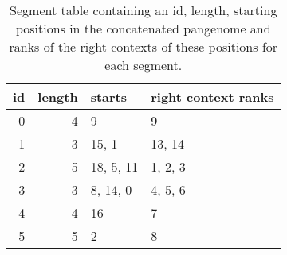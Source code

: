 \begin{table}
    \caption{
    Segment table containing an id, length, starting positions in the concatenated pangenome and ranks of the right contexts of these positions for each segment. \label{tab:segment}}
    \begin{tabular}{rrll}
        \toprule
        id & length & starts & right context ranks \\
        \midrule
        0 & 4 & 9           & 9         \\
        1 & 3 & 15, 1       & 13, 14    \\
        2 & 5 & 18, 5, 11   & 1, 2, 3   \\
        3 & 3 & 8, 14, 0    & 4, 5, 6   \\
        4 & 4 & 16          & 7         \\
        5 & 5 & 2           & 8         \\
        \bottomrule
    \end{tabular}
\end{table}


